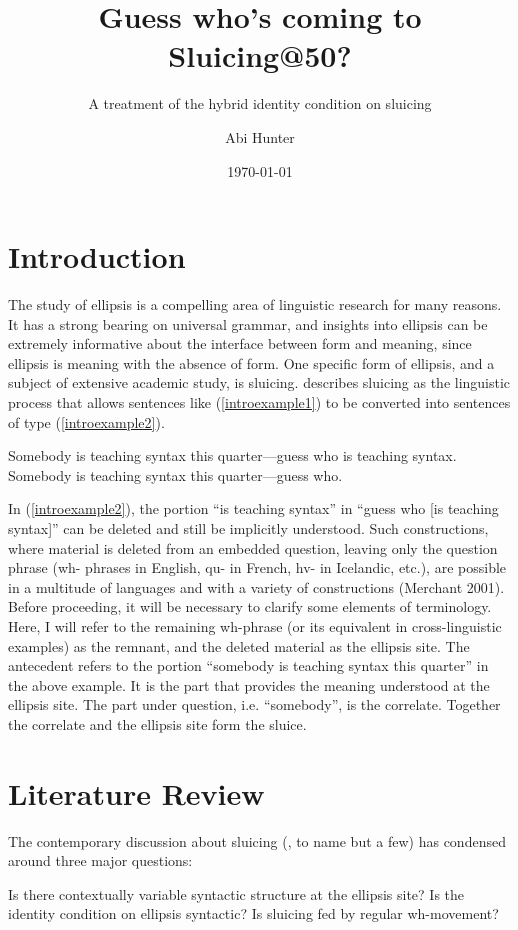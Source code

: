 \documentclass{turabian-researchpaper}
\title{Guess who's coming to Sluicing@50?}
\subtitle{A treatment of the hybrid identity condition on sluicing}
\author{Abi Hunter}
\date{\today}
\begin{document}
\maketitle


\section{Introduction}

The study of ellipsis is a compelling area of linguistic research for many reasons. It has a strong bearing on universal grammar, and insights into ellipsis can be extremely informative about the interface between form and meaning, since ellipsis is meaning with the absence of form. One specific form of ellipsis, and a subject of extensive academic study, is sluicing. \citet{rossguesswho} describes sluicing as the linguistic process that allows sentences like (\ref{introexample1}) to be converted into sentences of type (\ref{introexample2}). 

\begin{exe}
\ex\label{introexample1} Somebody is teaching syntax this quarter---guess who is teaching syntax. 
\ex\label{introexample2} Somebody is teaching syntax this quarter---guess who. 
\end{exe} 

In (\ref{introexample2}), the portion ``is teaching syntax'' in ``guess who [is teaching syntax]'' can be deleted and still be implicitly understood. Such constructions, where material is deleted from an embedded question, leaving only the question phrase (wh- phrases in English, qu- in French, hv- in Icelandic, etc.), are possible in a multitude of languages and with a variety of constructions (Merchant 2001).  Before proceeding, it will be necessary to clarify some elements of terminology. Here, I will refer to the remaining wh-phrase (or its equivalent in cross-linguistic examples) as the remnant, and the deleted material as the ellipsis site. The antecedent refers to the portion ``somebody is teaching syntax this quarter'' in the above example. It is the part that provides the meaning understood at the ellipsis site. The part under question, i.e. ``somebody'', is the correlate. Together the correlate and the ellipsis site form the sluice. 

\section{Literature Review}
The contemporary discussion about sluicing (\citep*{merchant, clm, barros14}, to name but a few) has condensed around three major questions: 
\begin{exe}
\ex\label{bigquestions} 
\begin{xlist}
\ex Is there contextually variable syntactic structure at the ellipsis site? 
\ex Is the identity condition on ellipsis syntactic? 
\ex Is sluicing fed by regular wh-movement? 
\end{xlist}
\end{exe}
\end{document}
